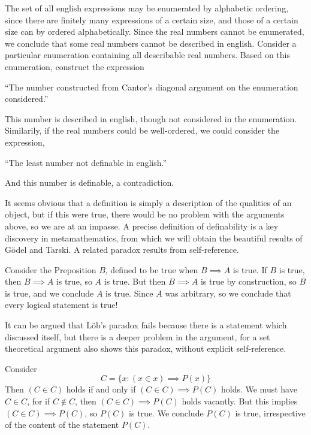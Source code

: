 \begin{example}
    The set of all english expressions may be enumerated by alphabetic ordering, since there are finitely many expressions of a certain size, and those of a certain size can by ordered alphabetically. Since the real numbers cannot be enumerated, we conclude that some real numbers cannot be described in english. Consider a particular enumeration containing all describable real numbers. Based on this enumeration, construct the expression
    \begin{center}
        ``The number constructed from Cantor's diagonal argument on the enumeration considered.''
    \end{center}
    This number is described in english, though not considered in the enumeration. Similarily, if the real numbers could be well-ordered, we could consider the expression,
    \begin{center}
        ``The least number not definable in english.''
    \end{center}
    And this number is definable, a contradiction.
\end{example}

It seems obvious that a definition is simply a description of the qualities of an object, but if this were true, there would be no problem with the arguments above, so we are at an impasse. A precise definition of definability is a key discovery in metamathematics, from which we will obtain the beautiful results of G\"{o}del and Tarski. A related paradox results from self-reference.

\begin{example}[L\"{o}b]
    Consider the Preposition $B$, defined to be true when $B \implies A$ is true. If $B$ is true, then $B \implies A$ is true, so $A$ is true. But then $B \implies A$ is true by construction, so $B$ is true, and we conclude $A$ is true. Since $A$ was arbitrary, so we conclude that every logical statement is true!
\end{example}

It can be argued that L\"{o}b's paradox fails because there is a statement which discussed itself, but there is a deeper problem in the argument, for a set theoretical argument also shows this paradox, without explicit self-reference.

\begin{example}[Curry]
     Consider
    \[ C = \{ x : (x \in x) \implies P(x) \} \]
    Then $(C \in C)$ holds if and only if $(C \in C) \implies P(C)$ holds. We must have $C \in C$, for if $C \not \in C$, then $(C \in C) \implies P(C)$ holds vacantly. But this implies $(C \in C) \implies P(C)$, so $P(C)$ is true. We conclude $P(C)$ is true, irrespective of the content of the statement $P(C)$.
\end{example}

